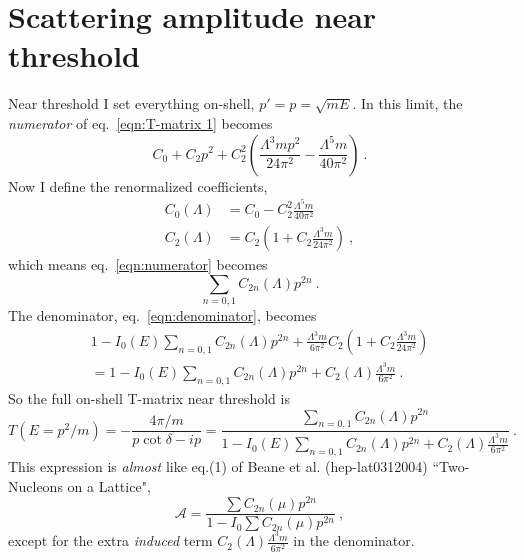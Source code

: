 \documentclass[11pt]{article}
\begin{document}
\section{Scattering amplitude near threshold}
Near threshold I set everything on-shell, $p'=p=\sqrt{mE}$.  In this limit, the \emph{numerator} of eq.~\eqref{eqn:T-matrix 1} becomes
\begin{equation}\label{eqn:numerator}
C_0+C_2 p^2+C_2^2 \left(\frac{\Lambda ^3 m p^2}{24 \pi ^2}-\frac{\Lambda ^5 m}{40 \pi
   ^2}\right)\ .
   \end{equation}
%   
Now I define the renormalized coefficients,
\begin{align}
C_0(\Lambda)&=C_0-C_2^2\frac{\Lambda^5 m}{40 \pi^2}\\
C_2(\Lambda)&=C_2\left(1+C_2\frac{\Lambda^3 m}{24\pi^2}\right)\ ,
\end{align}
which means eq.~\eqref{eqn:numerator} becomes
\begin{equation}
\sum_{n=0,1}C_{2n}(\Lambda)p^{2n}\ .
\end{equation}
The denominator, eq.~\eqref{eqn:denominator}, becomes
\begin{multline}
1-I_0(E)\sum_{n=0,1}C_{2n}(\Lambda)p^{2n}+\frac{\Lambda ^3 m}{6 \pi ^2}C_2 \left(1+
C_2 \frac{\Lambda ^3 m}{24 \pi
   ^2}\right)\\
   =1-I_0(E)\sum_{n=0,1}C_{2n}(\Lambda)p^{2n}+C_2(\Lambda) \frac{\Lambda ^3 m}{6 \pi ^2}\ .
\end{multline}
So the full on-shell T-matrix near threshold is
\begin{equation}
T(E=p^2/m)=-\frac{4\pi/m}{p\cot \delta -ip}=\frac{\sum_{n=0,1}C_{2n}(\Lambda)p^{2n}}{1-I_0(E)\sum_{n=0,1}C_{2n}(\Lambda)p^{2n}+C_2(\Lambda) \frac{\Lambda ^3 m}{6 \pi ^2}}\ .
\end{equation}
This expression is \emph{almost} like eq.(1) of Beane et al. (hep-lat0312004) ``Two-Nucleons on a Lattice",
\begin{displaymath}
\mathcal{A}=\frac{\sum C_{2 n}(\mu) p^{2 n}}{1-I_{0} \sum C_{2 n}(\mu) p^{2 n}}\ ,
\end{displaymath}
except for the extra \emph{induced} term $C_2(\Lambda) \frac{\Lambda ^3 m}{6 \pi ^2}$ in the denominator.  
\end{document}
